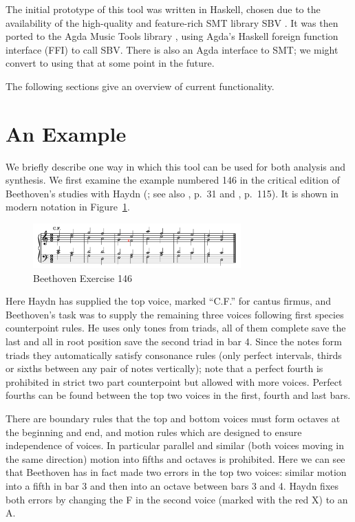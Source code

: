 \documentclass[sigplan,screen]{acmart}
\begin{document}
The initial prototype \citep{HaskellCounterpoint} of this tool was
written in Haskell, chosen due to the availability of the
high-quality and feature-rich SMT library SBV \citep{SBV}. It was then
ported to the Agda Music Tools library \cite{MusicTools}, using Agda's
Haskell foreign function interface (FFI) to call SBV. There is also an
Agda interface \citep{Schmitty} to SMT; we might convert to using
that at some point in the future.

The following sections give an overview of current
functionality. 

\section{An Example}

We briefly describe one way in which this tool can be used for both
analysis and synthesis. We first examine the example numbered 146 in
the critical edition of Beethoven's studies with Haydn
(\cite{BeethovenWerke13}; see also \cite{Nottebohm1971}, p.\ 31 and
\cite{Mann1987}, p.\ 115). It is shown in modern notation in
Figure~\ref{fig:b146}.

\begin{figure}
  \includegraphics[width=8cm]{figures/b146.png}
  \caption{Beethoven Exercise 146}
  \label{fig:b146}
\end{figure}

Here Haydn has supplied the top voice, marked ``C.F.'' for cantus
firmus, and Beethoven's task was to supply the remaining three voices
following first species counterpoint rules. He uses only tones from
triads, all of them complete save the last and all in root position
save the second triad in bar 4. Since the notes form triads they
automatically satisfy consonance rules (only perfect intervals, thirds
or sixths between any pair of notes vertically); note that a perfect
fourth is prohibited in strict two part counterpoint but allowed with
more voices. Perfect fourths can be found between the top two voices
in the first, fourth and last bars.

There are boundary rules that the top and bottom voices must form
octaves at the beginning and end, and motion rules which are designed
to ensure independence of voices. In particular parallel and similar
(both voices moving in the same direction) motion into fifths and
octaves is prohibited. Here we can see that Beethoven has in fact made
two errors in the top two voices: similar motion into a fifth in bar 3
and then into an octave between bars 3 and 4. Haydn fixes both errors
by changing the F in the second voice (marked with the red X) to an A.
\end{document}
